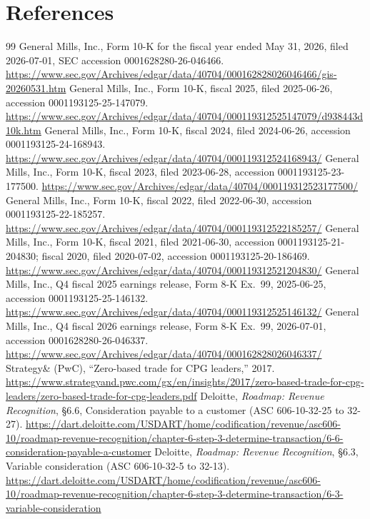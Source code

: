 \documentclass[10pt,letterpaper]{article}
\begin{document}
\section*{References}
\begingroup\small
\renewcommand{\refname}{}\vspace{-24pt}
\begin{thebibliography}{99}\setlength{\itemsep}{1pt}
 General Mills, Inc., Form 10-K for the fiscal year ended May 31, 2026, filed 2026-07-01, SEC accession 0001628280-26-046466. \url{https://www.sec.gov/Archives/edgar/data/40704/000162828026046466/gis-20260531.htm}
 General Mills, Inc., Form 10-K, fiscal 2025, filed 2025-06-26, accession 0001193125-25-147079. \url{https://www.sec.gov/Archives/edgar/data/40704/000119312525147079/d938443d10k.htm}
 General Mills, Inc., Form 10-K, fiscal 2024, filed 2024-06-26, accession 0001193125-24-168943. \url{https://www.sec.gov/Archives/edgar/data/40704/000119312524168943/}
 General Mills, Inc., Form 10-K, fiscal 2023, filed 2023-06-28, accession 0001193125-23-177500. \url{https://www.sec.gov/Archives/edgar/data/40704/000119312523177500/}
 General Mills, Inc., Form 10-K, fiscal 2022, filed 2022-06-30, accession 0001193125-22-185257. \url{https://www.sec.gov/Archives/edgar/data/40704/000119312522185257/}
 General Mills, Inc., Form 10-K, fiscal 2021, filed 2021-06-30, accession 0001193125-21-204830; fiscal 2020, filed 2020-07-02, accession 0001193125-20-186469. \url{https://www.sec.gov/Archives/edgar/data/40704/000119312521204830/}
 General Mills, Inc., Q4 fiscal 2025 earnings release, Form 8-K Ex.~99, 2025-06-25, accession 0001193125-25-146132. \url{https://www.sec.gov/Archives/edgar/data/40704/000119312525146132/}
 General Mills, Inc., Q4 fiscal 2026 earnings release, Form 8-K Ex.~99, 2026-07-01, accession 0001628280-26-046337. \url{https://www.sec.gov/Archives/edgar/data/40704/000162828026046337/}
 Strategy\& (PwC), ``Zero-based trade for CPG leaders,'' 2017. \url{https://www.strategyand.pwc.com/gx/en/insights/2017/zero-based-trade-for-cpg-leaders/zero-based-trade-for-cpg-leaders.pdf}
 Deloitte, \emph{Roadmap: Revenue Recognition}, \S6.6, Consideration payable to a customer (ASC 606-10-32-25 to 32-27). \url{https://dart.deloitte.com/USDART/home/codification/revenue/asc606-10/roadmap-revenue-recognition/chapter-6-step-3-determine-transaction/6-6-consideration-payable-a-customer}
 Deloitte, \emph{Roadmap: Revenue Recognition}, \S6.3, Variable consideration (ASC 606-10-32-5 to 32-13). \url{https://dart.deloitte.com/USDART/home/codification/revenue/asc606-10/roadmap-revenue-recognition/chapter-6-step-3-determine-transaction/6-3-variable-consideration}

\end{thebibliography}
\end{document}
